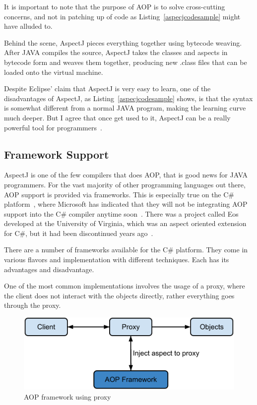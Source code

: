 It is important to note that the purpose of AOP is to solve cross-cutting concerns, and not in patching up of code as Listing~\ref{aspecjcodesample} might have alluded to.

Behind the scene, AspectJ pieces everything together using bytecode weaving. After JAVA compiles the source, AspectJ takes the classes and aspects in bytecode form and weaves them together, producing new .class files that can be loaded onto the virtual machine.

Despite Eclipse' claim that AspectJ is very easy to learn, one of the disadvantages of AspectJ, as Listing~\ref{aspecjcodesample} shows, is that the syntax is somewhat different from a normal JAVA program, making the learning curve much deeper. But I agree that once get used to it, AspectJ can be a really powerful tool for programmers~\cite{aspectj_text}.

\subsection{Framework Support}

AspectJ is one of the few compilers that does AOP, that is good news for JAVA programmers. For the vast majority of other programming languages out there, AOP support is provided via frameworks. This is especially true on the C\# platform~\cite{aopcs}, where Microsoft has indicated that they will not be integrating AOP support into the C\# compiler anytime soon~\cite{mastermind_text}. There was a project called Eos developed at the University of Virginia, which was an aspect oriented extension for C\#, but it had been discontinued years ago~\cite{eos_site, eos}.

There are a number of frameworks available for the C\# platform. They come in various flavors and implementation with different techniques. Each has its advantages and disadvantage.

One of the most common implementations involves the usage of a proxy, where the client does not interact with the objects directly, rather everything goes through the proxy.

\begin{figure}[here]
  \includegraphics[scale=0.70]{proxy.png}
  \centering
  \caption{AOP framework using proxy\label{proxy_model}}
\end{figure}


